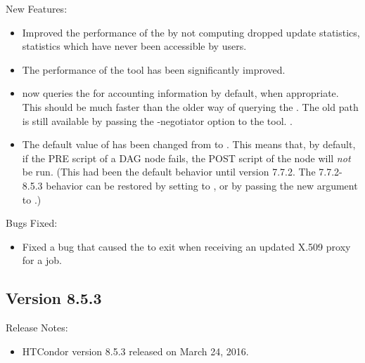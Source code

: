 \noindent New Features:

\begin{itemize}

\item Improved the performance of the  by
not computing dropped update statistics, statistics which 
have never been accessible by users.

\item The performance of the  tool has been
significantly improved.

\item {} now queries the  for 
accounting information by default, when appropriate.  This should be
much faster than the older way of querying the . The
old path is still available by passing the -negotiator option to the
tool.
.

\item The default value of  has been
changed from  to .  This means that, by
default, if the PRE script of a DAG node fails, the POST script
of the node will \emph{not} be run.  (This had been the default
behavior until version 7.7.2.  The 7.7.2-8.5.3 behavior can be
restored by setting  to 
, or by passing the new 
argument to .)

\end{itemize}

\noindent Bugs Fixed:

\begin{itemize}

\item Fixed a bug that caused the  to exit when receiving
an updated X.509 proxy for a job.

\end{itemize}

\subsection*{\label{sec:New-8-5-3}Version 8.5.3}

\noindent Release Notes:

\begin{itemize}

\item HTCondor version 8.5.3 released on March 24, 2016.

\end{itemize}

